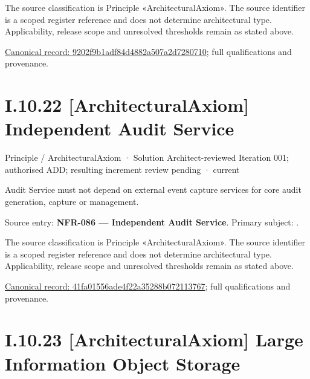 The source classification is Principle «ArchitecturalAxiom». The source identifier is a scoped register reference and does not determine architectural type. Applicability, release scope and unresolved thresholds remain as stated above.


{\footnotesize \href{../../../../continuum/motivation/principle/architectural-axiom/9202f9b1adf84d4882a507a2d7280710.md}{Canonical record: 9202f9b1adf84d4882a507a2d7280710}; full qualifications and provenance.}\par
\section*{I.10.22 [ArchitecturalAxiom] Independent Audit Service}
\label{navigation:I.10.22}

\label{element:41fa01556ade4f22a35288b072113767}
{\small Principle / ArchitecturalAxiom · Solution Architect-reviewed Iteration 001; authorised ADD; resulting increment review pending · current}\par

Audit Service must not depend on external event capture services for core audit generation, capture or management.



Source entry: \textbf{NFR-086 — Independent Audit Service}. Primary subject: \texttt{}.



The source classification is Principle «ArchitecturalAxiom». The source identifier is a scoped register reference and does not determine architectural type. Applicability, release scope and unresolved thresholds remain as stated above.


{\footnotesize \href{../../../../continuum/motivation/principle/architectural-axiom/41fa01556ade4f22a35288b072113767.md}{Canonical record: 41fa01556ade4f22a35288b072113767}; full qualifications and provenance.}\par
\section*{I.10.23 [ArchitecturalAxiom] Large Information Object Storage}
\label{navigation:I.10.23}

